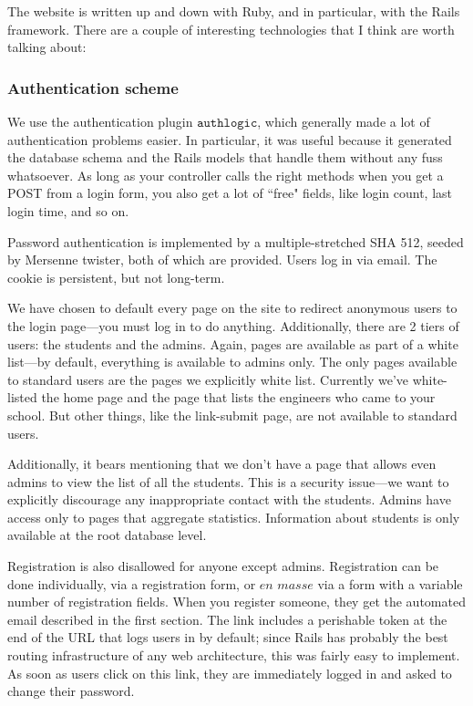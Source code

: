 \documentclass[11pt,a4paper]{article}
\begin{document}
The website is written up and down with Ruby, and in particular, with the Rails framework. There are a couple of interesting technologies that I think are worth talking about:

\subsubsection{Authentication scheme}

We use the authentication plugin $\texttt{authlogic}$, which generally made a lot of authentication problems easier. In particular, it was useful because it generated the database schema and the Rails models that handle them without any fuss whatsoever. As long as your controller calls the right methods when you get a POST from a login form, you also get a lot of ``free" fields, like login count, last login time, and so on.

Password authentication is implemented by a multiple-stretched SHA 512, seeded by Mersenne twister, both of which are provided. Users log in via email. The cookie is persistent, but not long-term.

We have chosen to default every page on the site to redirect anonymous users to the login page---you must log in to do anything. Additionally, there are 2 tiers of users: the students and the admins. Again, pages are available as part of a white list---by default, everything is available to admins only. The only pages available to standard users are the pages we explicitly white list. Currently we've white-listed the home page and the page that lists the engineers who came to your school. But other things, like the link-submit page, are not available to standard users.

Additionally, it bears mentioning that we don't have a page that allows even admins to view the list of all the students. This is a security issue---we want to explicitly discourage any inappropriate contact with the students. Admins have access only to pages that aggregate statistics. Information about students is only available at the root database level.

Registration is also disallowed for anyone except admins. Registration can be done individually, via a registration form, or $\textit{en masse}$ via a form with a variable number of registration fields. When you register someone, they get the automated email described in the first section. The link includes a perishable token at the end of the URL that logs users in by default; since Rails has probably the best routing infrastructure of any web architecture, this was fairly easy to implement. As soon as users click on this link, they are immediately logged in and asked to change their password.
\end{document}
